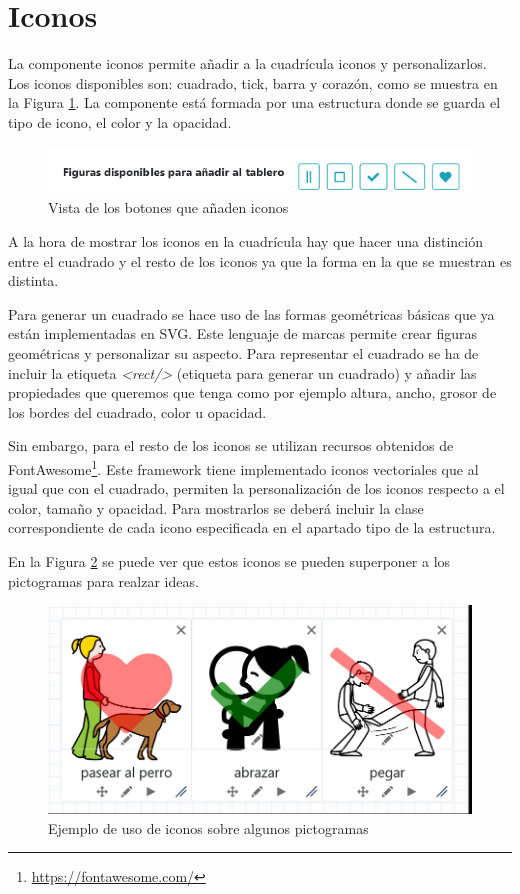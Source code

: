 \section{Iconos}
\label{cap5:sec:iconos}
La componente iconos permite añadir a la cuadrícula iconos y personalizarlos. Los iconos disponibles son: cuadrado, tick, barra y corazón, como se muestra en la Figura \ref{fig:herramientaitems}. La componente está formada por una estructura donde se guarda el tipo de icono, el color y la opacidad.

\begin{figure}[h!]
	\centering
	\includegraphics[width=0.7\linewidth]{Imagenes/Bitmap/herramientaItems}
	\caption{Vista de los botones que añaden iconos}
	\label{fig:herramientaitems}
\end{figure}


A la hora de mostrar los iconos en la cuadrícula hay que hacer una distinción entre el cuadrado y el resto de los iconos ya que la forma en la que se muestran es distinta.

Para generar un cuadrado se hace uso de las formas geométricas básicas que ya están implementadas en SVG. Este lenguaje de marcas permite crear figuras geométricas y personalizar su aspecto. Para representar el cuadrado se ha de incluir la etiqueta \textit{<rect/>} (etiqueta para generar un cuadrado) y añadir las propiedades que queremos que tenga como por ejemplo altura, ancho, grosor de los bordes del cuadrado, color u opacidad.

Sin embargo, para el resto de los iconos se utilizan recursos obtenidos de FontAwesome\footnote{\url{https://fontawesome.com/}}. Este framework tiene implementado iconos vectoriales que al igual que con el cuadrado, permiten la personalización de los iconos respecto a el color, tamaño y opacidad. Para mostrarlos se deberá incluir la clase correspondiente de cada icono especificada en el apartado tipo de la estructura.

En la Figura \ref{fig:ejemplopictoitem} se puede ver que estos iconos se pueden superponer a los pictogramas para realzar ideas.

\begin{figure}[h!]
	\centering
	\includegraphics[width=0.7\linewidth]{Imagenes/Bitmap/ejemploPictoItem}
	\caption{Ejemplo de uso de iconos sobre algunos pictogramas}
	\label{fig:ejemplopictoitem}
\end{figure}

